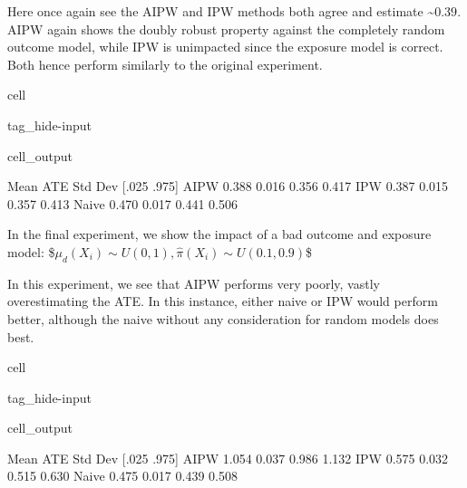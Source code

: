 \documentclass[letterpaper,10pt,english]{jupyterBook}
\begin{document}
\sphinxAtStartPar
Here once again see the AIPW and IPW methods both agree and estimate \textasciitilde{}\(0.39\). AIPW again shows the doubly robust property against the completely random outcome model, while IPW is unimpacted since the exposure model is correct. Both hence perform similarly to the original experiment.

\begin{sphinxuseclass}{cell}
\begin{sphinxuseclass}{tag_hide-input}\begin{sphinxVerbatimOutput}

\begin{sphinxuseclass}{cell_output}
\begin{sphinxVerbatim}[commandchars=\\\{\}]
       Mean ATE  Std Dev  [.025  .975]
AIPW      0.388    0.016  0.356  0.417
IPW       0.387    0.015  0.357  0.413
Naive     0.470    0.017  0.441  0.506
\end{sphinxVerbatim}

\noindent{}

\end{sphinxuseclass}\end{sphinxVerbatimOutput}

\end{sphinxuseclass}
\end{sphinxuseclass}
\sphinxAtStartPar
In the final experiment, we show the impact of a bad outcome and exposure model: \$\(\mu_d(X_i) \sim U(0,1),  \hat \pi (X_i) \sim U(0.1,0.9) \)\$

\sphinxAtStartPar
In this experiment, we see that AIPW performs very poorly, vastly over\sphinxhyphen{}estimating the ATE. In this instance, either naive or IPW would perform better, although the naive without any consideration for random models does best.

\begin{sphinxuseclass}{cell}
\begin{sphinxuseclass}{tag_hide-input}\begin{sphinxVerbatimOutput}

\begin{sphinxuseclass}{cell_output}
\begin{sphinxVerbatim}[commandchars=\\\{\}]
       Mean ATE  Std Dev  [.025  .975]
AIPW      1.054    0.037  0.986  1.132
IPW       0.575    0.032  0.515  0.630
Naive     0.475    0.017  0.439  0.508
\end{sphinxVerbatim}

\noindent{}

\end{sphinxuseclass}\end{sphinxVerbatimOutput}

\end{sphinxuseclass}
\end{sphinxuseclass}
\end{document}
